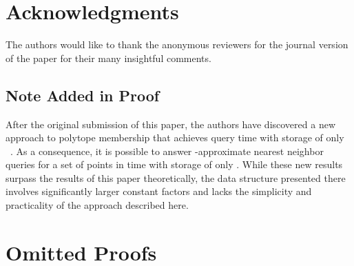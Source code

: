 \documentclass[11pt]{article}   \usepackage[letterpaper,hmargin=2.1cm,vmargin=3cm]{geometry}
\begin{document}
\section{Acknowledgments}


The authors would like to thank the anonymous reviewers for the journal version of the paper for their many insightful comments.

\subsection*{Note Added in Proof}


After the original submission of this paper, the authors have discovered a new approach to polytope membership that achieves query time  with storage of only ~\cite{AFM17}. As a consequence, it is possible to answer -approximate nearest neighbor queries for a set of  points in  time with storage of only . While these new results surpass the results of this paper theoretically, the data structure presented there involves significantly larger constant factors and lacks the simplicity and practicality of the approach described here.








\appendix

\section{Omitted Proofs}


{\VCLemmaStmt*}
\end{document}
